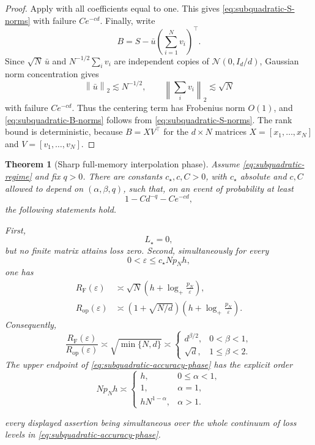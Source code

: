 \documentclass[11pt]{article}
\newtheorem{theorem}{Theorem}[section]
\theoremstyle{definition}
\newcommand{\cN}{\mathcal N}
\newcommand{\Id}{I}
\newcommand{\norm}[1]{\left\lVert #1\right\rVert_2}
\newcommand{\RF}{R_{\mathrm F}}
\newcommand{\Rop}{R_{\mathrm{op}}}
\newcommand{\eps}{\varepsilon}
\begin{document}
\begin{proof}
Apply  with all coefficients equal to one.  This
gives \eqref{eq:subquadratic-S-norms} with failure $Ce^{-cd}$.  Finally,
write
\[
 B=S-\bar u\left(\sum_{i=1}^N v_i\right)^\top.
\]
Since $\sqrt N\,\bar u$ and
$N^{-1/2}\sum_i v_i$ are independent copies of
$\cN(0,\Id_d/d)$, Gaussian norm concentration gives
\[
 \norm{\bar u}\lesssim N^{-1/2},
 \qquad
 \norm{\sum_i v_i}\lesssim\sqrt N
\]
with failure $Ce^{-cd}$.  Thus the centering term has Frobenius norm
$O(1)$, and \eqref{eq:subquadratic-B-norms} follows from
\eqref{eq:subquadratic-S-norms}.  The rank bound is deterministic,
because $B=XV^\top$ for the $d\times N$ matrices
$X=[x_1,\ldots,x_N]$ and $V=[v_1,\ldots,v_N]$.
\end{proof}

\begin{theorem}[Sharp full-memory interpolation phase]
\label{thm:subquadratic-interpolation}
Assume \eqref{eq:subquadratic-regime} and fix $q>0$.  There are constants
$c_\star,c,C>0$, with $c_\star$ absolute and $c,C$ allowed to depend on
$(\alpha,\beta,q)$, such that, on an event of probability at least
\begin{equation}
 1-Cd^{-q}-Ce^{-cd},
 \label{eq:subquadratic-main-prob}
\end{equation}
the following statements hold.

First,
\begin{equation}
 L_\star=0,
 \label{eq:subquadratic-Lstar}
\end{equation}
but no finite matrix attains loss zero.  Second, simultaneously for
every
\begin{equation}
 0<\eps\leq c_\star Np_Nh,
 \label{eq:subquadratic-accuracy-phase}
\end{equation}
one has
\begin{align}
 \RF(\eps)
 &\asymp
 \sqrt N\left(h+\log_+\frac{p_N}{\eps}\right),
 \label{eq:subquadratic-RF}\\
 \Rop(\eps)
 &\asymp
 \left(1+\sqrt{N/d}\right)
 \left(h+\log_+\frac{p_N}{\eps}\right).
 \label{eq:subquadratic-Rop}
\end{align}
Consequently,
\begin{equation}
 \frac{\RF(\eps)}{\Rop(\eps)}
 \asymp
 \sqrt{\min\{N,d\}}
 \asymp
 \begin{cases}
 d^{\beta/2},&0<\beta<1,\\
 \sqrt d,&1\leq\beta<2.
 \end{cases}
 \label{eq:subquadratic-separation}
\end{equation}
The upper endpoint of \eqref{eq:subquadratic-accuracy-phase} has the
explicit order
\begin{equation}
 Np_Nh\asymp
 \begin{cases}
 h,&0\leq\alpha<1,\\
 1,&\alpha=1,\\
 hN^{1-\alpha},&\alpha>1.
 \end{cases}
 \label{eq:subquadratic-endpoint}
\end{equation}

every displayed assertion being simultaneous over the whole continuum
of loss levels in \eqref{eq:subquadratic-accuracy-phase}.
\end{theorem}
\end{document}
